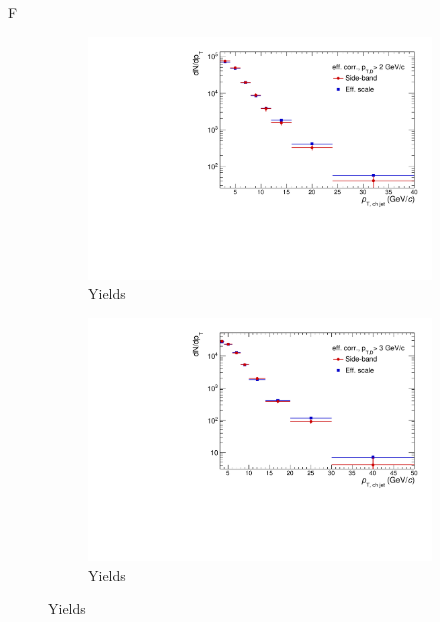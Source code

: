 F%

\begin{figure}[bth]
\centering
\begin{subfigure}[b]{0.45\textwidth}
\includegraphics[width=\textwidth]{pPbplots/methodsComparison/DjetSpectra_methodComparison_FASTwoSDD_eff_ptD2}
\caption{Yields}
\end{subfigure}
\begin{subfigure}[b]{0.45\textwidth}
\includegraphics[width=\textwidth]{pPbplots/methodsComparison/DjetSpectra_methodComparison_FASTwoSDD_eff_ptD3}
\caption{Yields}
\end{subfigure}

\end{figure}
